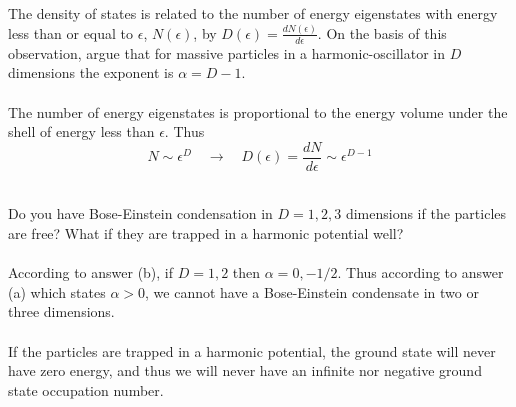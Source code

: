 \documentclass[11pt,letterpaper]{article}
\begin{document}
            	\item
            	The density of states is related to the number of energy eigenstates with energy less than
            	or equal to $\epsilon$, $N(\epsilon)$, by $D(\epsilon) = \frac{dN(\epsilon)}{d\epsilon}$.
            	On the basis of this observation, argue that for massive particles in a harmonic-oscillator in 
            	$D$ dimensions the exponent is $\alpha = D-1$.
            	\\
		\\
		The number of energy eigenstates is proportional to the energy volume under the shell of 
		energy less than $\epsilon$. Thus
		\[
			N \sim \epsilon^D \quad\to\quad D(\epsilon) = \frac{dN}{d\epsilon} \sim \epsilon^{D-1}
		\]
		\\
            	\item
            	Do you have Bose-Einstein condensation in $D=1,2,3$ dimensions if the particles are free? 
		What if they are trapped in a harmonic potential well?
		\\
		\\
		According to answer (b), if $D=1,2$ then $\alpha = 0,-1/2$. Thus according to answer
		(a) which states $\alpha > 0$, we cannot have a Bose-Einstein condensate in two 
		or three dimensions. 
		\\
		\\
		If the particles are trapped in a harmonic potential, the ground state will never have zero
		energy, and thus we will never have an infinite nor negative ground state occupation number.
		\\
	\eenum
	
\end{document}
